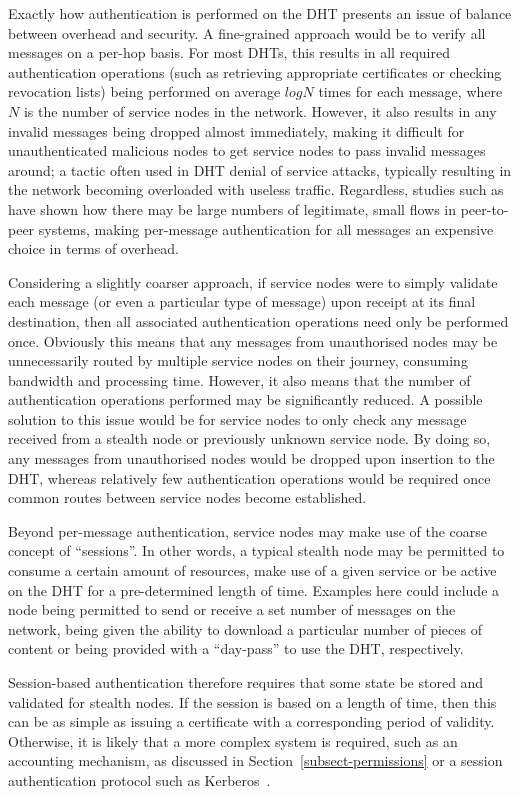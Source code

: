 \documentclass{elsart3p}
\begin{document}
Exactly how authentication is performed on the DHT presents an issue
of balance between overhead and security. A fine-grained approach
would be to verify all messages on a per-hop basis. For most DHTs,
this results in all required authentication operations (such as
retrieving appropriate certificates or checking revocation lists)
being performed on average $log{N}$ times for each message, where
$N$ is the number of service nodes in the network. However, it also
results in any invalid messages being dropped almost immediately,
making it difficult for unauthenticated malicious nodes to get
service nodes to pass invalid messages around; a tactic often used
in DHT denial of service attacks, typically resulting in the network
becoming overloaded with useless traffic. Regardless, studies such
as~\cite{Saroiu02Measurement} have shown how there may be large
numbers of legitimate, small flows in peer-to-peer systems, making
per-message authentication for all messages an expensive choice in
terms of overhead.

Considering a slightly coarser approach, if service nodes were to
simply validate each message (or even a particular type of message)
upon receipt at its final destination, then all associated
authentication operations need only be performed once. Obviously
this means that any messages from unauthorised nodes may be
unnecessarily routed by multiple service nodes on their journey,
consuming bandwidth and processing time. However, it also means that
the number of authentication operations performed may be
significantly reduced. A possible solution to this issue would be
for service nodes to only check any message received from a stealth
node or previously unknown service node. By doing so, any messages
from unauthorised nodes would be dropped upon insertion to the DHT,
whereas relatively few authentication operations would be required
once common routes between service nodes become established.

Beyond per-message authentication, service nodes may make use of the
coarse concept of ``sessions''. In other words, a typical stealth
node may be permitted to consume a certain amount of resources, make
use of a given service or be active on the DHT for a pre-determined
length of time. Examples here could include a node being permitted
to send or receive a set number of messages on the network, being
given the ability to download a particular number of pieces of
content or being provided with a ``day-pass'' to use the DHT,
respectively.

Session-based authentication therefore requires that some state be
stored and validated for stealth nodes. If the session is based on a
length of time, then this can be as simple as issuing a certificate
with a corresponding period of validity. Otherwise, it is likely
that a more complex system is required, such as an accounting
mechanism, as discussed in Section~\ref{subsect-permissions} or a
session authentication protocol such as
Kerberos~\cite{Neuman94Kerberos}.
\end{document}
